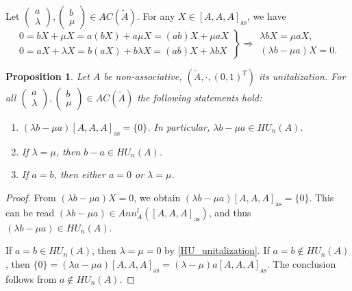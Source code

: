 \documentclass[12pt]{article}
\newtheorem{proposition}[theorem]{Proposition}
\begin{document}
		Let $\begin{pmatrix}
			a \\ \lambda
		\end{pmatrix}, \begin{pmatrix}
			b \\ \mu
		\end{pmatrix}\in AC(\tilde{A})$. For any $X\in[A,A,A]_{\mathrm{as}}$, we have
		\begin{equation*}
			\left.\begin{array}{c}
				0=bX+\mu X= a(bX)+a\mu X=(ab)X+\mu aX  \\
				0=aX+\lambda X= b(aX)+b\lambda X=(ab)X+\lambda bX
			\end{array}\right\}\Rightarrow
			\begin{array}{l}
				\lambda bX=\mu aX,\\
				(\lambda b - \mu a)X=0.
			\end{array}
		\end{equation*}
		\begin{proposition}
			Let $A$ be non-associative, $(\tilde{A},\cdot,(0,1)^T)$ its unitalization. For all $\begin{pmatrix}
				a \\ \lambda
			\end{pmatrix},\begin{pmatrix}
				b \\ \mu
			\end{pmatrix}\in AC(\tilde{A})$ the following statements hold:
			\begin{enumerate}[label=\textnormal{\arabic*)}]
				\item $(\lambda b-\mu a)[A,A,A]_{\mathrm{as}}=\{0\}$. In particular, $\lambda b-\mu a\in HU_n(A)$.
				\item If $\lambda=\mu$, then $b-a\in HU_n(A)$.
				\item If $a=b$, then either $a=0$ or $\lambda=\mu$.
			\end{enumerate}
		\end{proposition}
		\begin{proof}
			From $(\lambda b - \mu a)X=0$, we obtain $(\lambda b-\mu a)[A,A,A]_{\mathrm{as}}=\{0\}$. This can be read $(\lambda b-\mu a)\in Ann_A^l([A,A,A]_{\mathrm{as}})$, and thus $(\lambda b-\mu a)\in HU_n(A)$.
			
			If $a=b\in HU_n(A)$, then $\lambda=\mu=0$ by \cref{HU_unitalization}. If $a=b\notin HU_n(A)$, then $\{0\}=(\lambda a-\mu a)[A,A,A]_{\mathrm{as}}=(\lambda-\mu)a[A,A,A]_{\mathrm{as}}$. The conclusion follows from $a\notin HU_n(A)$.
		\end{proof}
		
\end{document}
